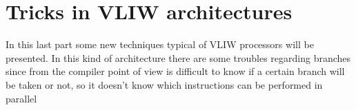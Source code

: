 \section{Tricks in VLIW architectures}
In this last part some new techniques typical of VLIW processors will be
presented. In this kind of architecture there are some troubles regarding
branches since from the compiler point of view is difficult to know if a
certain branch will be taken or not, so it doesn't know which instructions can
be performed in parallel

